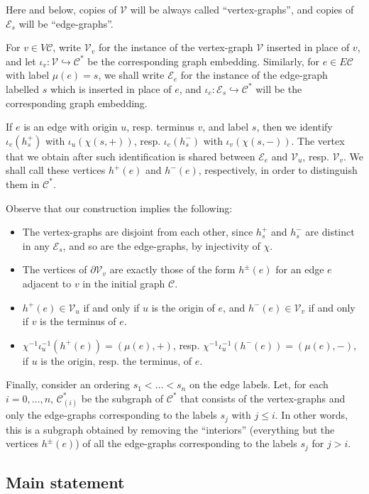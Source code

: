 \documentclass[ALCO,ThmDefs,Unicode,epreuves]{cedram}
\newcommand{\cC}{\mathcal{C}}
\newcommand{\cV}{\mathcal{V}}
\newcommand{\cE}{\mathcal{E}}
\begin{document}
Here and below, copies of $\cV$ will be always called ``vertex-graphs'', and copies of $\cE_s$ will be ``edge-graphs''. 

For $v\in V\cC$, write $\cV_v$ for the instance of the vertex-graph $\cV$ inserted in place of $v$, and let ${\iota}_v:\cV {\hookrightarrow} \cC^*$ be the corresponding graph embedding. Similarly, for $e\in E\cC$ with label $\mu(e)=s$, we shall write $\cE_e$ for the instance of the edge-graph labelled $s$ which is inserted in place of $e$, and ${\iota}_e:\cE_{s}{\hookrightarrow} \cC^*$ will be the corresponding graph embedding.

If $e$ is an edge with origin $u$, resp. terminus $v$, and label $s$, then we identify ${\iota}_e(h_s^{+})$ with $ {\iota}_u({\chi}(s, +))$, resp. ${\iota}_e(h_s^{-})$ with ${\iota}_v({\chi}(s, -))$. The vertex that we obtain after such identification is shared between $\cE_e$ and $\cV_u$, resp. $\cV_v$. We shall call these vertices $h^{+}(e)$ and $h^{-}(e)$, respectively, in order to distinguish them in $\cC^*$.

Observe that our construction implies the following:
\begin{itemize}
\item The vertex-graphs are disjoint from each other, since $h_s^+$ and $h_s^-$ are distinct in any $\cE_s$, and so are the edge-graphs, by injectivity of ${\chi}$.
\item The vertices of ${\partial}\cV_v$ are exactly those of the form $h^{\pm}(e)$ for an edge $e$ adjacent to $v$ in the initial graph $\cC$.
\item $h^{+}(e) \in \cV_u$ if and only if $u$ is the origin of $e$, and $h^{-}(e) \in \cV_v$ if and only if $v$ is the terminus of $e$.
\item ${\chi}^{-1}{\iota}_u^{-1}(h^+(e)) = ({\mu}(e), +)$, resp. ${\chi}^{-1}{\iota}_u^{-1}(h^-(e)) = ({\mu}(e), -)$, if $u$ is the origin, resp. the terminus, of $e$.\end{itemize}

Finally, consider an ordering $s_{1} < \dots < s_n$ on the edge labels. Let, for each $i=0, \dots, n$, $\cC^*_{(i)}$ be the subgraph of $\cC^*$ that consists of the vertex-graphs and only the edge-graphs corresponding to the labels $s_j$ with $j \leq i$. In other words, this is a subgraph obtained by removing the ``interiors'' (\ie everything but the vertices $h^{\pm}(e)$) of all the edge-graphs corresponding to the labels $s_j$ for $j > i$.

\subsection{Main statement}\label{section:main-statement-substitution}
\end{document}
